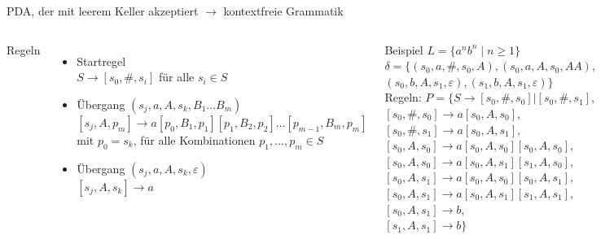 \begin{frame}{PDA, der mit leerem Keller akzeptiert $\rightarrow$ kontextfreie Grammatik}
	\label{Grammatik_aus_PDA}
	\begin{columns}
		Regeln
		\begin{itemize}
			\item Startregel\\
			$S\rightarrow [s_0, \#, s_i]$ für alle $s_i \in S$
			\item Übergang $(s_j,a,A,s_k,B_1\ldots B_m)$\\
			$[s_j,A,p_m] \rightarrow a[p_0,B_1,p_1][p_1,B_2,p_2]\ldots[p_{m-1},B_m,p_m]$\\
			mit $p_0=s_k$, für alle Kombinationen $p_1,\ldots,p_m \in S$
			\item Übergang $(s_j,a,A,s_k,\varepsilon)$\\
			$[s_j,A,s_k]\rightarrow a$
		\end{itemize}
		Beispiel $L=\{a^nb^n \mid n \geq 1\}$\\
		 $\delta=\{(s_0,a,\#,s_0,A),(s_0,a,A,s_0,AA),$\\
		 \qquad$(s_0,b,A,s_1,\varepsilon),(s_1,b,A,s_1,\varepsilon)\}$\\
		 \vspace{0.5em}
		Regeln: $P=\{S \rightarrow [s_0,\#,s_0]|[s_0,\#,s_1],$\\
			$[s_0,\#,s_0]\rightarrow a[s_0,A,s_0],$\\
			$[s_0,\#,s_1]\rightarrow a[s_0,A,s_1],$\\
			$[s_0,A,s_0]\rightarrow a[s_0,A,s_0][s_0,A,s_0],$\\
			$[s_0,A,s_0]\rightarrow a[s_0,A,s_1][s_1,A,s_0],$\\
			$[s_0,A,s_1]\rightarrow a[s_0,A,s_0][s_0,A,s_1],$\\
			$[s_0,A,s_1]\rightarrow a[s_0,A,s_1][s_1,A,s_1],$\\
			$[s_0,A,s_1]\rightarrow b,$\\ $[s_1,A,s_1]\rightarrow b\}$
	\end{columns}
\end{frame}

